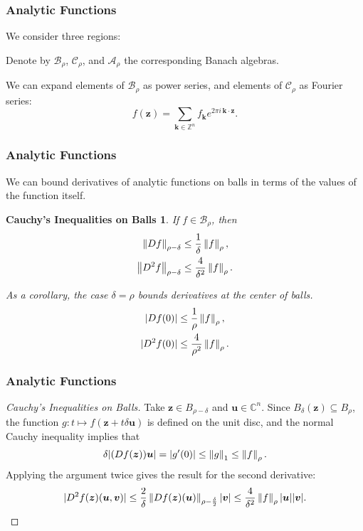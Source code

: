 \documentclass{beamer}
\newcommand{\Z}{\mathbb{Z}}
\newcommand{\C}{\mathbb{C}}
\newcommand{\bp}[1]{\bm{#1}}
\newcommand{\genericdel}[4]{%
  \ifcase#3\relax
  #1#4#2\or
  \bigl#1#4\bigr#2\or
  \Bigl#1#4\Bigr#2\or
  \biggl#1#4\biggr#2\or
  \Biggl#1#4\Biggr#2\else
  \left#1#4\right#2\fi
}
\newcommand{\enVert}[2][-1]{\genericdel\|\|{#1}{#2}}
\let\norm\enVert
\begin{document}
\begin{frame}
  \frametitle{Analytic Functions}
  We consider three regions:
  \domains{}

  Denote by $\mathcal{B}_\rho$, $\mathcal{C}_\rho$, and $\mathcal{A}_\rho$ the
  corresponding Banach algebras.

  We can expand elements of $\mathcal{B}_{\rho}$ as power series, and elements of
  $\mathcal{C}_{\rho}$ as Fourier series:
  \begin{equation*}
    f(\bp{z}) = \sum_{\bp{k} \in \Z^n} f_{\bp{k}} e^{2 \pi i \, \bp{k} \cdot \bp{z}}.
  \end{equation*}
\end{frame}

\begin{frame}
  \frametitle{Analytic Functions}
  We can bound derivatives of analytic functions on balls in terms of the values
  of the function itself.
  \newtheorem{cauchyball}{Cauchy's Inequalities on Balls}
  \begin{cauchyball}
    If $f \in \mathcal{B}_{\rho}$, then
    \begin{align*}
      \norm{Df}_{\rho - \delta} &\leq \frac{1}{\delta} \norm{f}_{\rho},\\
      \norm{D^2 f}_{\rho - \delta} &\leq \frac{4}{\delta^2} \norm{f}_{\rho}.
    \end{align*}

    As a corollary, the case $\delta = \rho$ bounds derivatives at the center of
    balls.
    \begin{align*}
      |Df(0)| &\leq \frac{1}{\rho} \norm{f}_{\rho},\\
      |D^2 f(0)| &\leq \frac{4}{\rho^2} \norm{f}_{\rho}.
    \end{align*}
  \end{cauchyball}
\end{frame}

\begin{frame}
  \frametitle{Analytic Functions}
  \begin{proof}[Cauchy's Inequalities on Balls]
    Take $\bp{z} \in B_{\rho - \delta}$ and $\bp{u} \in \C^n$.
    Since $B_{\delta}(\bp{z}) \subseteq B_{\rho}$, the function $g : t \mapsto
    f(\bp{z} + t \delta \bp{u})$ is defined on the unit disc, and the normal
    Cauchy inequality implies that
    \begin{equation*}
      \delta|(Df(\bp{z}))\bp{u}| = |g'(0)| \leq \norm{g}_1 \leq
      \norm{f}_{\rho}.
    \end{equation*}
    Applying the argument twice gives the result for the second derivative:
    \begin{equation*}
      |D^2 f(\bp{z})(\bp{u}, \bp{v})| \leq \frac{2}{\delta}
      \norm{Df(\bp{z})(\bp{u})}_{\rho - \frac{\delta}{2}}|\bp{v}| \leq
      \frac{4}{\delta^2} \norm{f}_{\rho} |\bp{u}||\bp{v}|.
    \end{equation*}
  \end{proof}
\end{frame}
\end{document}
